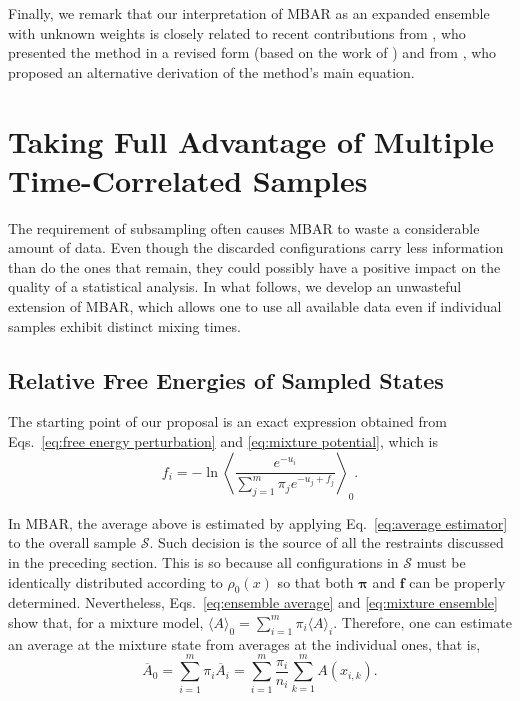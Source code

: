 \documentclass[journal=jctcce,manuscript=article]{achemso}
\newcommand{\vt}[1]{\boldsymbol{\mathbf{#1}}}   %
\newcommand{\avg}[1]{\overline{#1}}             %
\begin{document}
Finally, we remark that our interpretation of MBAR as an expanded ensemble with unknown weights is closely related to recent contributions from \citeauthor{Shirts_2017} \cite{Shirts_2017}, who presented the method in a revised form (based on the work of \citeauthor{Geyer_1994} \cite{Geyer_1994}) and from \citeauthor{Ding_2017} \cite{Ding_2017}, who proposed an alternative derivation of the method's main equation.

\section{Taking Full Advantage of Multiple Time-Correlated Samples}

The requirement of subsampling often causes MBAR to waste a considerable amount of data. Even though the discarded configurations carry less information than do the ones that remain, they could possibly have a positive impact on the quality of a statistical analysis. In what follows, we develop an unwasteful extension of MBAR, which allows one to use all available data even if individual samples exhibit distinct mixing times.

\subsection{Relative Free Energies of Sampled States}

The starting point of our proposal is an exact expression obtained from Eqs.~\eqref{eq:free energy perturbation} and \eqref{eq:mixture potential}, which is
\begin{equation*}
\label{eq:free energy exact}
f_i = -\ln \left\langle \frac{e^{-u_i}}{\sum_{j=1}^m \pi_j e^{-u_j + f_j}} \right\rangle_0.
\end{equation*}

In MBAR, the average above is estimated by applying Eq.~\eqref{eq:average estimator} to the overall sample $\mathcal S$. Such decision is the source of all the restraints discussed in the preceding section. This is so because all configurations in $\mathcal S$ must be identically distributed according to $\rho_0(x)$ so that both $\vt \pi$ and $\vt f$ can be properly determined. Nevertheless, Eqs.~\eqref{eq:ensemble average} and \eqref{eq:mixture ensemble} show that, for a mixture model, $\langle A \rangle_0 = \sum_{i=1}^m \pi_i \langle A \rangle_i$. Therefore, one can estimate an average at the mixture state from averages at the individual ones, that is,
\begin{equation}
\label{eq:mixture average estimator}
{\avg A}_0 = \sum_{i=1}^m \pi_i \avg{A}_i = \sum_{i=1}^m \frac{\pi_i}{n_i} \sum_{k=1}^m A(x_{i,k}).
\end{equation}
\end{document}
